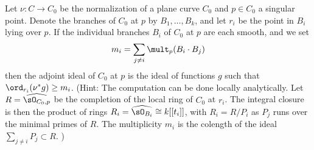 \begin{exercise}
Let $\nu : C \to C_0$ be the normalization of a plane curve $C_0$ and $p \in C_0$ a singular point. Denote the branches of $C_0$ at $p$ by $B_1,\dots,B_k$, and let $r_i$ be the point in $B_i$ lying over $p$. If the individual branches $B_i$ of $C_0$ at $p$ are each smooth, and we set
$$
m_i = \sum_{j \neq i} \mult_p(B_i \cdot B_j)
$$
then the adjoint ideal of $C_0$ at $p$ is the ideal of functions $g$ such that $\ord_{r_i}(\nu^*g) \geq m_i$.
(Hint: The computation can be done locally analytically. Let $R = \widehat{\sO_{C_0, p}}$ be the completion of the local ring
of $C_0$ at $r_i$. The integral closure is then the product of rings $R_i = \widehat{\sO_{B_i}} \cong k[[t_i]]$,
with $R_i = R/P_i$ as $P_j$ runs over the minimal primes of $R$. The multiplicity
$m_i$ is the colength of the ideal $\sum_{j\neq i}P_j \subset R$.
)
\end{exercise}


